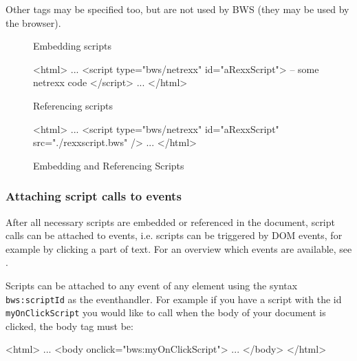 
Other tags may be specified too, but are not used by BWS (they may be used by the browser).

\begin{figure}[htb]

	Embedding scripts

	\begin{verbatim*}
	<html>
	...
	<script type="bws/netrexx" id="aRexxScript">
	-- some netrexx code
	</script>
	...
	</html>
	\end{verbatim*}

	
	Referencing scripts
	

	\begin{verbatim*}
	<html>
	...
	<script type="bws/netrexx" id="aRexxScript" src="./rexxscript.bws" />
	...
	</html>
	\end{verbatim*}
	
	\label{fig:EmbeddingAndReferencingScripts}
	\caption{Embedding and Referencing Scripts}

\end{figure}

\subsubsection{Attaching script calls to events}

After all necessary scripts are embedded or referenced in the document, script calls can be attached to events, i.e. scripts can be triggered by DOM events, for example by clicking a part of text. For an overview which events are available, see \cite{ReferenceDOMEvents}.

Scripts can be attached to any event of any element using the syntax \texttt{bws:scriptId} as the eventhandler. For example if you have a script with the id \texttt{myOnClickScript} you would like to call when the body of your document is clicked, the body tag must be:

\begin{verbatim*}
<html>
...
<body onclick="bws:myOnClickScript">
...
</body>
</html>
\end{verbatim*}

